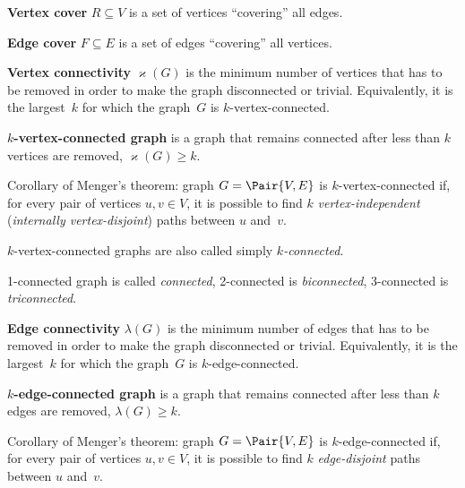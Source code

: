 \documentclass[a4paper,10pt]{article}
\newcommand{\vertexConnectivity}[1]{\varkappa(#1)}
\newcommand{\edgeConnectivity}[1]{\lambda(#1)}
\begin{document}
\begin{terms}
    \item \textbf{Vertex cover} $R \subseteq V$ is a set of vertices \enquote{covering} all edges.

    \item \textbf{Edge cover} $F \subseteq E$ is a set of edges \enquote{covering} all vertices.

    \item \textbf{Vertex connectivity} $\vertexConnectivity{G}$ is the minimum number of vertices that has to be removed in order to make the graph disconnected or trivial.
    Equivalently, it is the largest~$k$ for which the graph~$G$ is $k$-vertex-connected.

    \item \textbf{$k$-vertex-connected graph} is a graph that remains connected after less than $k$ vertices are removed, \ie $\vertexConnectivity{G} \geq k$.
    \begin{terms}
        \item Corollary of Menger's theorem: graph $G = \Pair{V,E}$ is $k$-vertex-connected if, for every pair of vertices $u,v \in V$, it is possible to find $k$ \emph{vertex-independent} (\emph{internally vertex-disjoint}) paths between $u$ and~$v$.
        \item $k$-vertex-connected graphs are also called simply \emph{$k$-connected}.
        \item 1-connected graph is called \emph{connected}, 2-connected is \emph{biconnected}, 3-connected is \emph{triconnected}.
    \end{terms}

    \item \textbf{Edge connectivity} $\edgeConnectivity{G}$ is the minimum number of edges that has to be removed in order to make the graph disconnected or trivial.
    Equivalently, it is the largest~$k$ for which the graph~$G$ is $k$-edge-connected.

    \item \textbf{$k$-edge-connected graph} is a graph that remains connected after less than $k$ edges are removed, \ie $\edgeConnectivity{G} \geq k$.
    \begin{terms}
        \item Corollary of Menger's theorem: graph $G = \Pair{V,E}$ is $k$-edge-connected if, for every pair of vertices $u,v \in V$, it is possible to find $k$ \emph{edge-disjoint} paths between $u$ and~$v$.
    \end{terms}


\end{terms}
\end{document}
